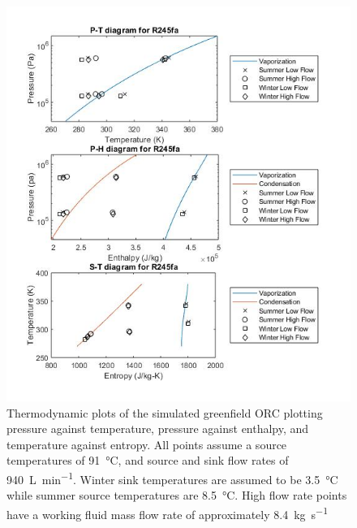 \begin{figure}%
	\centering
	\caption{Thermodynamic plots of the simulated greenfield ORC plotting pressure against temperature, pressure against enthalpy, and temperature against entropy. All points assume a source temperatures of \SI{91}{\degreeCelsius}, and source and sink flow rates of \SI{940}{\liter\per\minute}. Winter sink temperatures are assumed to be \SI{3.5}{\degreeCelsius} while summer source temperatures are \SI{8.5}{\degreeCelsius}. High flow rate points have a working fluid mass flow rate of approximately \SI{8.4}{\kilogram\per\second}}
	\label{fig:gf_themoplots}
	
	\includegraphics[width=\textwidth]{figures/GreenfieldThermoPlots}
\end{figure}